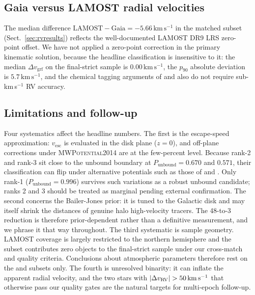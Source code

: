 \documentclass{caosp310}
\newcommand{\vgrf}{v_{\mathrm{grf}}}
\newcommand{\Punb}{P_{\mathrm{unbound}}}
\newcommand{\vesc}{v_{\mathrm{esc}}}
\newcommand{\kmps}{\ensuremath{\,\mathrm{km}\,\mathrm{s}^{-1}}}
\begin{document}
\subsection{Gaia versus LAMOST radial velocities}
\label{sec:rvdiscuss}

The median difference $\mathrm{LAMOST}-\mathrm{Gaia}=-5.66\kmps$ in the
matched subset (Sect.~\ref{sec:rvresults}) reflects the well-documented
LAMOST DR9 LRS zero-point offset. We have not applied a zero-point
correction in the primary kinematic solution, because the headline
classification is insensitive to it: the median $\Delta\vgrf$ on the
final-strict sample is $0.00\kmps$, the $p_{90}$ absolute deviation is
$5.7\kmps$, and the chemical tagging arguments of
\citet{Hawkins2018ChemicalTagging} and \citet{Bromley2018NearbyHighSpeed}
also do not require sub-km\,s$^{-1}$ RV accuracy.

\subsection{Limitations and follow-up}
\label{sec:limitations}

Four systematics affect the headline numbers. The first is the
escape-speed approximation: $\vesc$ is evaluated in the disk plane
($z=0$), and off-plane corrections under \textsc{MWPotential2014} are at
the few-percent level. Because rank-2 and rank-3 sit close to the
unbound boundary at $\Punb=0.670$ and $0.571$, their classification can
flip under alternative potentials such as those of
\citet{McMillan2017MWMass} and \citet{Piffl2014RAVEvesc,Monari2018Vesc}.
Only rank-1 ($\Punb=0.996$) survives such variations as a robust
unbound candidate; ranks 2 and 3 should be treated as marginal pending
external confirmation. The second concerns the Bailer-Jones prior: it
is tuned to the Galactic disk and may itself shrink the distances of
genuine halo high-velocity tracers. The 48-to-3 reduction is therefore
prior-dependent rather than a definitive measurement, and we phrase it
that way throughout. The third systematic is sample geometry. LAMOST
coverage is largely restricted to the northern hemisphere and the
\citet{Li2023ExtremeVelocity88} subset contributes zero objects to the
final-strict sample under our cross-match and quality criteria.
Conclusions about atmospheric parameters therefore rest on the
\citet{Li2021HVS591} and \citet{Liao2024HVS519} subsets only. The
fourth is unresolved binarity: it can inflate the apparent radial
velocity, and the two stars with $|\Delta v_{\rm RV}|>50\kmps$ that
otherwise pass our quality gates are the natural targets for
multi-epoch follow-up.
\end{document}

